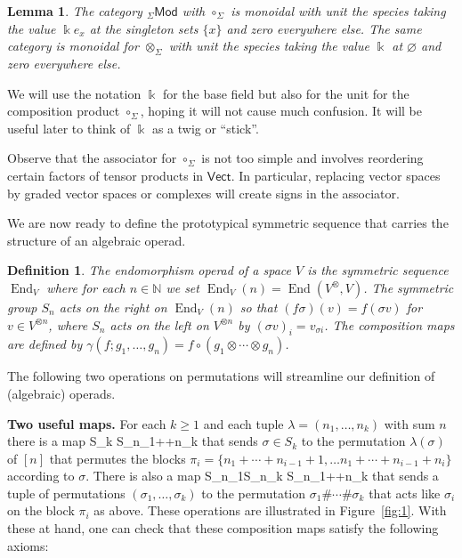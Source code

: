 \documentclass[fleqn,a4paper, twoside]{article}
\makeatletter
\newcommand{\0}{\langle 0\rangle}
\newcommand{\End}{\operatorname{End}}
\let\[\@undefined
\DeclareRobustCommand{\[}{\begin{equation}}%
\let\]\@undefined
\DeclareRobustCommand{\]}{\end{equation}}%
\theoremstyle{mytheorem}
\newtheorem{lemma}[theorem]{Lemma}
\theoremstyle{introthm}
\theoremstyle{mydefinition}
\newtheorem{definition}[theorem]{Definition}
\theoremstyle{mydefinition2}
\theoremstyle{plain} %
\newcommand{\Mod}{\mathsf{Mod}}
\newcommand{\?}{\,?\,}
\newcommand{\NN}{\mathbb N}
\newcommand{\kk}{\Bbbk}
\theoremstyle{mytheorem}
\theoremstyle{plain} %
\makeatother
\begin{document}
\begin{lemma}
The category ${}_\Sigma\Mod$ with $\circ_\Sigma$ is
monoidal with unit the species taking the value $\kk e_x$ at 
the singleton sets $\{x\}$ and zero everywhere else. The same
category is monoidal for $\otimes_\Sigma$ with unit
the species taking the value $\kk$ at $\varnothing$
and zero everywhere else.
\end{lemma}

We will use the notation $\kk$ for the base field but
also for the unit for the composition product $\circ_\Sigma$,
hoping it will not cause much confusion. It will be useful 
later to think of $\kk$ as a twig or ``stick''.

Observe that the associator for $\circ_\Sigma$ is
not too simple and involves reordering certain
factors of tensor products in $\mathsf{Vect}$. In
particular, replacing vector spaces by graded vector
spaces or complexes will create signs in the
associator.

We are now ready to define the prototypical symmetric
 sequence that carries the structure of an algebraic 
 operad. 
 
\begin{definition}
The \emph{endomorphism operad} of a space $V$ is the symmetric sequence $\End_V$
where for each $n\in\NN$ we set $\End_V(n) = \End(V^\otimes, V)$. 
The symmetric group $S_n$ acts on the right
on $\End_V(n)$ 
so that $(f\sigma)(v) = f(\sigma v)$ for
$v\in V^{\otimes n}$, where $S_n$ acts on
the left on $V^{\otimes n}$ by $(\sigma v)_i
= v_{\sigma i}$. The composition maps are defined
by $\gamma(f;g_1,\ldots,g_n) = f\circ (g_1\otimes\cdots \otimes g_n)$. 
\end{definition}

The following two operations on permutations 
will streamline our definition of (algebraic)
operads.

\medskip

\textbf{Two useful maps.} For each $k\geqslant 1$
and each tuple $\lambda = (n_1,\ldots,n_k)$ 
with sum $n$
there is a map
\[ S_k \longrightarrow S_{n_1+\cdots+n_k} \]
that sends $\sigma\in S_k$ to the permutation
$\lambda(\sigma)$ of $[n]$ that permutes the blocks 
$\pi_i = \{n_1+\cdots+n_{i-1}+1,\ldots
			n_1+\cdots+n_{i-1}+n_i\}$
			according to $\sigma$.
There is also a map
\[S_{n_1}\times \cdots \times  S_{n_k} 
	\longrightarrow S_{n_1+\cdots+n_k}  \] 
	that sends a tuple of permutations 
	$(\sigma_1,\ldots,\sigma_k)$ to the
	permutation $\sigma_1\#\cdots \# \sigma_k$
	that acts like $\sigma_i$ on the block $\pi_i$
	as above. These operations are illustrated
	in Figure~\ref{fig:1}. With these at hand, 
one can check that these composition maps
satisfy the following axioms:
\end{document}
